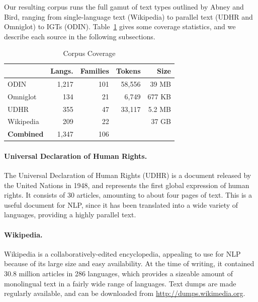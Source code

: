 Our resulting corpus runs the full gamut of text types outlined by Abney and Bird, ranging from single-language text (Wikipedia) to parallel text (UDHR and Omniglot) to IGTs (ODIN).  Table~\ref{table:corpus} gives some coverage statistics, and we describe each source in the following subsections.


\begin{table}[t]
\small
\centering
    \begin{tabular}{l|rr|rr}
    ~         				& Langs. 	& Families 	& Tokens		& Size	\\ \hline
    ODIN      				& 1,217      & 101       		& 58,556		& 39 MB		\\
    Omniglot  				& 134        & 21        		&	6,749			& 677 KB	\\
    UDHR      				& 355        & 47        		&	33,117		& 5.2 MB	\\
    Wikipedia 				& 209        & 22       		&						& 37 GB		\\ \hline
    \textbf{Combined}	& 1,347			 & 106 
    \end{tabular}
\caption{Corpus Coverage}
\label{table:corpus}
\end{table}



\paragraph{Universal Declaration of Human Rights.}

The Universal Declaration of Human Rights (UDHR) is a document released by the United Nations in 1948, and represents the first global expression of human rights. It consists of 30 articles, amounting to about four pages of text. This is a useful document for NLP, since it has been translated into a wide variety of languages, providing a highly parallel text.


\paragraph{Wikipedia.}

Wikipedia is a collaboratively-edited encyclopedia, appealing to use for NLP because of its large size and easy availability. At the time of writing, it contained 30.8 million articles in 286 languages, which provides a sizeable amount of monolingual text in a fairly wide range of languages. Text dumps are made regularly available, and can be downloaded from \url{http://dumps.wikimedia.org}.


